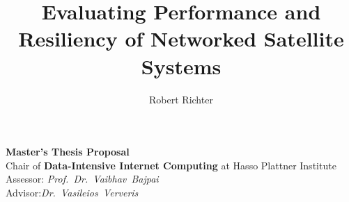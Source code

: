 \documentclass[a4, 12pt]{article}
\begin{document}
\author{Robert Richter}
\title{Evaluating Performance and Resiliency of Networked Satellite Systems}
\maketitle


\noindent
\textbf{Master's Thesis Proposal} \\
Chair of \textbf{Data-Intensive Internet Computing} at Hasso Plattner Institute \\

\noindent
Assessor: \textit{Prof.~Dr.~Vaibhav~Bajpai} \\
Advisor:\textit{Dr.~Vasileios~Ververis}

\tableofcontents
\newpage



\newpage

\printbibliography

\end{document}
